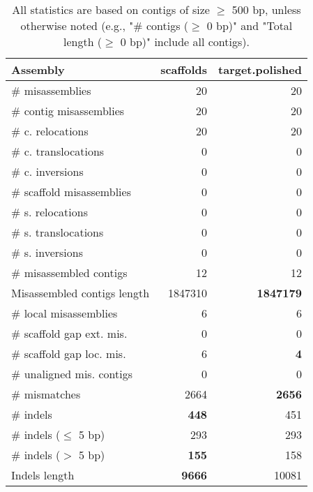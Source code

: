 \documentclass[12pt,a4paper]{article}
\begin{document}
\begin{table}[ht]
\begin{center}
\caption{All statistics are based on contigs of size $\geq$ 500 bp, unless otherwise noted (e.g., "\# contigs ($\geq$ 0 bp)" and "Total length ($\geq$ 0 bp)" include all contigs).}
\begin{tabular}{|l*{2}{|r}|}
\hline
Assembly & scaffolds & target.polished \\ \hline
\# misassemblies & 20 & 20 \\ \hline
\hspace{2mm}\# contig misassemblies & 20 & 20 \\ \hline
\hspace{5mm}\# c. relocations & 20 & 20 \\ \hline
\hspace{5mm}\# c. translocations & 0 & 0 \\ \hline
\hspace{5mm}\# c. inversions & 0 & 0 \\ \hline
\hspace{2mm}\# scaffold misassemblies & 0 & 0 \\ \hline
\hspace{5mm}\# s. relocations & 0 & 0 \\ \hline
\hspace{5mm}\# s. translocations & 0 & 0 \\ \hline
\hspace{5mm}\# s. inversions & 0 & 0 \\ \hline
\# misassembled contigs & 12 & 12 \\ \hline
Misassembled contigs length & 1847310 & {\bf 1847179} \\ \hline
\# local misassemblies & 6 & 6 \\ \hline
\# scaffold gap ext. mis. & 0 & 0 \\ \hline
\# scaffold gap loc. mis. & 6 & {\bf 4} \\ \hline
\# unaligned mis. contigs & 0 & 0 \\ \hline
\# mismatches & 2664 & {\bf 2656} \\ \hline
\# indels & {\bf 448} & 451 \\ \hline
\hspace{5mm}\# indels ($\leq$ 5 bp) & 293 & 293 \\ \hline
\hspace{5mm}\# indels ($>$ 5 bp) & {\bf 155} & 158 \\ \hline
Indels length & {\bf 9666} & 10081 \\ \hline
\end{tabular}
\end{center}
\end{table}
\end{document}
